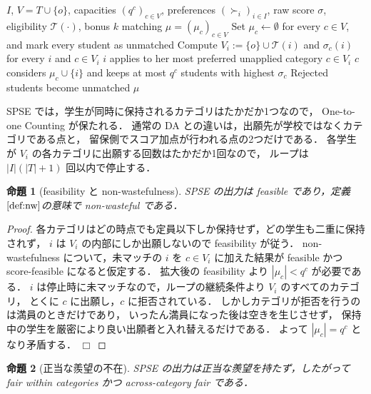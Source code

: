 \documentclass[
    12pt,          %
    a4paper,       %
    oneside,       %
    onecolumn,     %
    titlepage,     %
    final          %
]{jreport} %
\newcommand{\refdefinition}[1]{定義 $\ref{#1}$}
\newtheorem{proof}{証明}[chapter]
\newtheorem{proposition}{命題}[chapter]
\newcommand{\qed}{\hfill $\Box$ \par}
\renewcommand{\T}{\mathcal{T}}   %
\begin{document}
\begin{algorithm}[htbp]
\caption{Student-Proposing Score-Elevated Mechanism（SPSE）}
\label{alg:spse}
\begin{algorithmic}[1]
\Require $I$, $V=T\cup\{o\}$, capacities $(q^c)_{c\in V}$, preferences $(\succ_i)_{i\in I}$,
         raw score $\sigma$, eligibility $\T(\cdot)$, bonus $k$
\Ensure matching $\mu=(\mu_c)_{c\in V}$
\State Set $\mu_c\gets\emptyset$ for every $c\in V$, and mark every student as unmatched
\State Compute $V_i:=\{o\}\cup\T(i)$ and $\sigma_c(i)$ for every $i$ and $c\in V_i$
    \State $i$ applies to her most preferred unapplied category $c\in V_i$
    \State $c$ considers $\mu_c\cup\{i\}$ and keeps at most $q^c$ students with highest $\sigma_c$
    \State Rejected students become unmatched
\EndWhile
\State \Return $\mu$
\end{algorithmic}
\end{algorithm}

SPSE では，学生が同時に保持されるカテゴリはたかだか1つなので，
One-to-one Counting が保たれる．
通常の DA との違いは，出願先が学校ではなくカテゴリである点と，
留保側でスコア加点が行われる点の2つだけである．
各学生が $V_i$ の各カテゴリに出願する回数はたかだか1回なので，
ループは $|I|(|T|+1)$ 回以内で停止する．

\begin{proposition}[feasibility と non-wastefulness]
\label{prop:spse-basic}
SPSE の出力は feasible であり，\refdefinition{def:nw}の意味で non-wasteful である．
\end{proposition}

\begin{proof}
各カテゴリはどの時点でも定員以下しか保持せず，どの学生も二重に保持されず，
$i$ は $V_i$ の内部にしか出願しないので feasibility が従う．
non-wastefulness について，未マッチの $i$ を $c\in V_i$ に加えた結果が
feasible かつ score-feasible になると仮定する．
拡大後の feasibility より $|\mu_c|<q^c$ が必要である．
$i$ は停止時に未マッチなので，ループの継続条件より $V_i$ のすべてのカテゴリ，
とくに $c$ に出願し，$c$ に拒否されている．
しかしカテゴリが拒否を行うのは満員のときだけであり，
いったん満員になった後は空きを生じさせず，
保持中の学生を厳密により良い出願者と入れ替えるだけである．
よって $|\mu_c|=q^c$ となり矛盾する．
\qed
\end{proof}

\begin{proposition}[正当な羨望の不在]
\label{prop:spse-nje}
SPSE の出力は正当な羨望を持たず，したがって fair within categories かつ across-category fair である．
\end{proposition}
\end{document}
